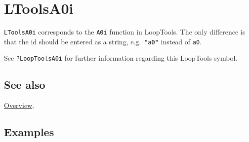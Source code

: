 \documentclass[../FeynHelpersManual.tex]{subfiles}
\begin{document}
\hypertarget{ltoolsa0i}{
\section{LToolsA0i}\label{ltoolsa0i}}

\texttt{LToolsA0i} corresponds to the \texttt{A0i} function in
LoopTools. The only difference is that the id should be entered as a
string, e.g.~\texttt{"a0"} instead of \texttt{a0}.

See \texttt{?LoopTools\textasciigrave A0i} for further information
regarding this LoopTools symbol.

\subsection{See also}

\hyperlink{toc}{Overview}.

\subsection{Examples}
\end{document}
